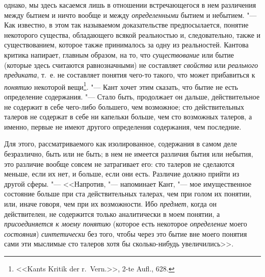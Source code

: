 однако, мы здесь касаемся лишь в отношении встречающегося в нем различения
между бытием и ничто вообще и между {\em определенными}
бытием и небытием. "--- Как известно, в этом так называемом доказательстве
предпосылается, понятие некоторого существа, обладающего всякой реальностью
и, следовательно, также и существованием, которое также принималось за одну
из реальностей. Кантова критика напирает, главным образом, на то, что
{\em существование} или бытие (которые здесь считаются
равнозначными) не составляет {\em свойства} или
{\em реального предиката}, т.~е. не составляет понятия
чего-то такого, что может прибавиться к {\em понятию}
некоторой вещи\footnote{<<Kants Kritik der r.~Vern.>>,
2-te Aufl., 628.}.
"--- Кант хочет этим сказать, что бытие не
есть определение содержания. "--- Стало быть, продолжает он дальше,
действительное не содержит в себе чего-либо большего, чем возможное; сто
действительных талеров не содержат в себе ни капельки больше, чем сто
возможных талеров, а именно, первые не имеют другого определения
содержания, чем последние.

Для этого, рассматриваемого как изолированное, содержания в самом деле
безразлично, быть или не быть; в нем не имеется различия бытия или небытия,
это различие вообще совсем не затрагивает его: сто талеров не сделаются
меньше, если их нет, и больше, если они есть. Различие должно прийти из
другой сферы. "--- <<Напротив, "--- напоминает Кант, "--- мое имущественное состояние
больше при ста действительных талерах, чем при голом их понятии, или, иначе
говоря, чем при их возможности. Ибо {\em предмет},
когда он действителен, не содержится только аналитически в моем понятии, а
{\em присоединяется к моему понятию} (которое есть
некоторое {\em определение} моего
{\em состояния}) {\em синтетически}
без того, чтобы через это бытие вне моего понятия сами эти мыслимые сто
талеров хотя бы сколько-нибудь увеличились>>.

